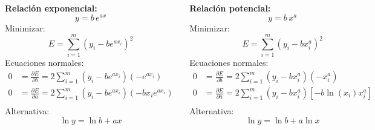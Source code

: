 \documentclass[9pt, aspectratio=169]{beamer}
\begin{document}
\begin{frame}
  \begin{columns}[t]
    \cx
    \textbf{Relación exponencial:}
    \[ y = b \, e^{a x} \]
    Minimizar:
    \[ E = \sum_{i=1}^m (y_i - b e^{a x_i})^2 \]
    Ecuaciones normales:
    \begin{align*}
      0 & = \frac{\partial E}{\partial b} = 2 \sum_{i=1}^m (y_i - b e^{a x_i})(-e^{a x_i})       \\
      0 & = \frac{\partial E}{\partial a} = 2 \sum_{i=1}^m (y_i - b e^{a x_i})(-b x_i e^{a x_i}) \\
    \end{align*}
    \alert{Alternativa:}
    \[ \ln y = \ln b + a x \]

    \cx
    \textbf{Relación potencial:}
    \[ y = b \, x^{a} \]
    Minimizar:
    \[ E = \sum_{i=1}^m (y_i - b x_i^a)^2 \]
    Ecuaciones normales:
    \begin{align*}
      0 & = \frac{\partial E}{\partial b} = 2 \sum_{i=1}^m (y_i - b x_i^{a})(-x_i^{a})            \\
      0 & = \frac{\partial E}{\partial a} = 2 \sum_{i=1}^m (y_i - b x_i^{a})[-b \ln(x_i) x_i^{a}] \\
    \end{align*}
    \alert{Alternativa:}
    \[ \ln y = \ln b + a \ln x \]
  \end{columns}
\end{frame}
\end{document}
